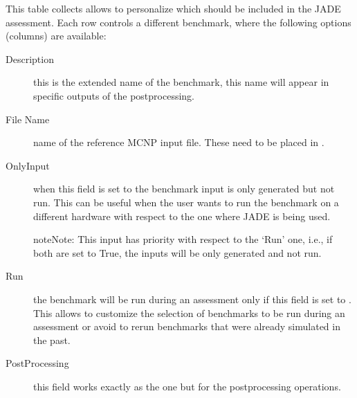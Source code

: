 \documentclass[letterpaper,10pt,english]{sphinxmanual}
\begin{document}
\sphinxAtStartPar
This table collects allows to personalize which  should be included
in the JADE assessment. Each row controls a different benchmark, where the following options
(columns) are available:
\begin{description}
\item[{Description}] \leavevmode
\sphinxAtStartPar
this is the extended name of the benchmark, this name will appear in specific outputs of the
post\sphinxhyphen{}processing.

\item[{File Name}] \leavevmode
\sphinxAtStartPar
name of the reference MCNP input file. These need to be placed in .

\item[{OnlyInput}] \leavevmode
\sphinxAtStartPar
when this field is set to  the benchmark input is only generated but not run. This can be
useful when the user wants to run the benchmark on a different hardware with respect to the
one where JADE is being used.


\nopagebreak


\sphinxAtStartPar
{\hyperref[\detokenize{usage/tipstricks:externalrun}]{}}



\begin{sphinxadmonition}{note}{Note:}
\sphinxAtStartPar
This input has priority with respect to the ‘Run’ one, i.e., if both are
set to True, the inputs will be only generated and not run.
\end{sphinxadmonition}

\item[{Run}] \leavevmode
\sphinxAtStartPar
the benchmark will be run during an assessment only if this field is set to .
This allows to customize the selection of benchmarks to be run during an assessment or avoid
to re\sphinxhyphen{}run benchmarks that were already simulated in the past.

\item[{Post\sphinxhyphen{}Processing}] \leavevmode
\sphinxAtStartPar
this field works exactly as the  one but for the post\sphinxhyphen{}processing operations.

\end{description}
\end{document}
